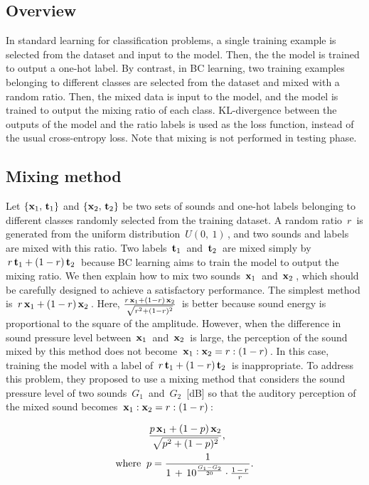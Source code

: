 \documentclass[10pt,twocolumn,letterpaper]{article}
\begin{document}
\subsection{Overview}
In standard learning for classification problems, a single training example is selected from the dataset and input to the model. Then, the the model is trained to output a one-hot label. By contrast, in BC learning, two training examples belonging to different classes are selected from the dataset and mixed with a random ratio. Then, the mixed data is input to the model, and the model is trained to output the mixing ratio of each class. KL-divergence between the outputs of the model and the ratio labels is used as the loss function, instead of the usual cross-entropy loss. Note that mixing is not performed in testing phase.


\subsection{Mixing method}\label{mixsound}
Let $\{{\bf x}_1,\, {\bf t}_1\}$ and $\{{\bf x}_2,\, {\bf t}_2\}$ be two sets of sounds and one-hot labels belonging to different classes randomly selected from the training dataset. A random ratio $\, r \,$ is generated from the uniform distribution $\, U(0,\ 1) \,$, and two sounds and labels are mixed with this ratio. Two labels $\, {\bf t}_1\, $ and $\, {\bf t}_2 \,$ are mixed simply by $\, r \, {\bf t}_1 + (1-r) \, {\bf t}_2 \,$ because BC learning aims to train the model to output the mixing ratio. We then explain how to mix two sounds $\, {\bf x}_1 \,$ and $\, {\bf x}_2 \,$, which should be carefully designed to achieve a satisfactory performance. The simplest method is $\, r \, {\bf x}_1 + (1-r) \, {\bf x}_2 \,$. Here, $\frac{r \, {\bf x}_1 + (1-r) \, {\bf x}_2}{\sqrt{r^2 + (1-r)^2}}\,$ is better because sound energy is proportional to the square of the amplitude. However, when the difference in sound pressure level between $\, {\bf x}_1 \,$ and $\, {\bf x}_2 \,$ is large, the perception of the sound mixed by this method does not become $\, {\bf x}_1:{\bf x}_2=r:(1-r) \,$. In this case, training the model with a label of $\, r \, {\bf t}_1 + (1-r) \, {\bf t}_2 \,$ is inappropriate. To address this problem, they proposed to use a mixing method that considers the sound pressure level of two sounds $\, G_1 \,$ and $\, G_2 \,$ [dB] so that the auditory perception of the mixed sound becomes $\, {\bf x}_1:{\bf x}_2=r:(1-r) \,$:

\begin{equation}
\label{eqn:mixsound}
\begin{split}
  \frac{p \, {\bf x}_1 + (1-p) \, {\bf x}_2}{\sqrt{p^2 + (1-p)^2}}, \hspace{10mm} \\ 
  {\rm where} \;\; p = \frac{1}{1\,+\, 10^{\frac{G_1-G_2}{20}} \cdot \frac{1\,-\,r}{r}}.
\end{split}
\end{equation}
\end{document}
